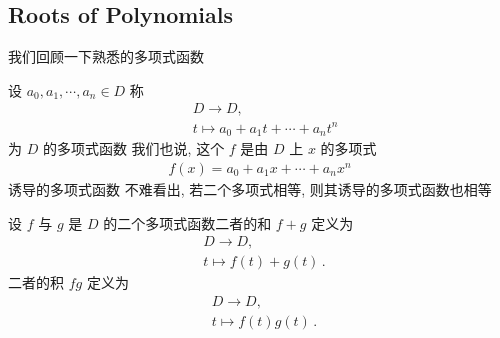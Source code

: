 \subsection*{Roots of Polynomials}

我们回顾一下熟悉的多项式函数\period

\begin{definition}
    设 $a_0, a_1, \cdots, a_n \in D$ 称
    \begin{align*}
         & D \to D, \tag*{$f \colon$}               \\
         & t \mapsto a_0 + a_1 t + \cdots + a_n t^n
    \end{align*}
    为 $D$ 的多项式函数 \period 我们也说, 这个 $f$ 是由 $D$ 上 $x$ 的多项式
    \begin{align*}
        f(x) = a_0 + a_1 x + \cdots + a_n x^n
    \end{align*}
    诱导的多项式函数 \period 不难看出, 若二个多项式相等, 则其诱导的多项式函数也相等\period
\end{definition}

\begin{definition}
    设 $f$ 与 $g$ 是 $D$ 的二个多项式函数\period 二者的和 $f+g$ 定义为
    \begin{align*}
         & D \to D, \tag*{$f+g \colon$}  \\
         & t \mapsto f(t) + g(t) \period
    \end{align*}
    二者的积 $fg$ 定义为
    \begin{align*}
         & D \to D, \tag*{$fg \colon$} \\
         & t \mapsto f(t) g(t) \period
    \end{align*}
\end{definition}

